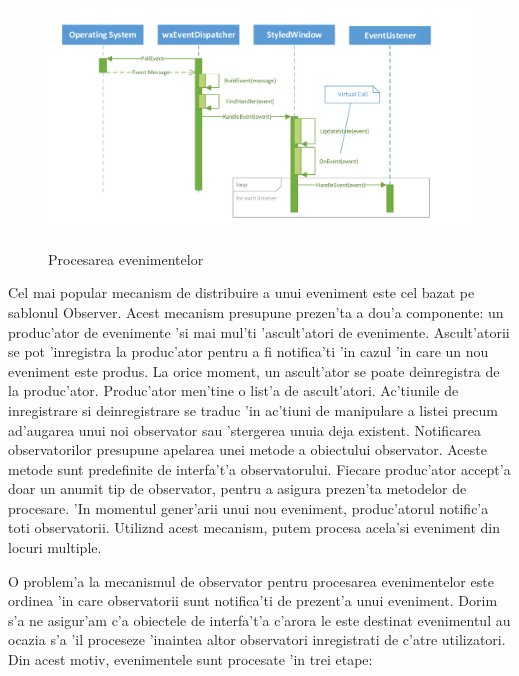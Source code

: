 \begin{center}
\begin{figure}[h]
    \centering
    \includegraphics[scale=0.9]{img/seq_event_processing.pdf}
    \label{fig0402}
    \caption{Procesarea evenimentelor}
\end{figure}
\end{center}

Cel mai popular mecanism de distribuire a unui eveniment este cel bazat pe sablonul Observer. Acest mecanism presupune prezen'ta a dou'a componente: un produc'ator de evenimente 'si mai mul'ti 'ascult'atori de evenimente. Ascult'atorii se pot 'inregistra la produc'ator pentru a fi notifica'ti 'in cazul 'in care un nou eveniment este produs. La orice moment, un ascult'ator se poate deinregistra de la produc'ator. Produc'ator men'tine o list'a de ascult'atori. Ac'tiunile de inregistrare si deinregistrare se traduc 'in ac'tiuni de manipulare a listei precum ad'augarea unui noi observator sau 'stergerea unuia deja existent. Notificarea observatorilor presupune apelarea unei metode a obiectului observator. Aceste metode sunt predefinite de interfa't'a observatorului. Fiecare produc'ator accept'a doar un anumit tip de observator, pentru a asigura prezen'ta metodelor de procesare. 'In momentul gener'arii unui nou eveniment, produc'atorul notific'a toti observatorii. Utiliz{\ia}nd acest mecanism, putem procesa acela'si eveniment din locuri multiple.

\medskip

O problem'a la mecanismul de observator pentru procesarea evenimentelor este ordinea 'in care observatorii sunt notifica'ti de prezent'a unui eveniment. Dorim s'a ne asigur'am c'a obiectele de interfa't'a c'arora le este destinat evenimentul au ocazia s'a 'il proceseze 'inaintea altor observatori inregistrati de c'atre utilizatori. Din acest motiv, evenimentele sunt procesate 'in trei etape:

